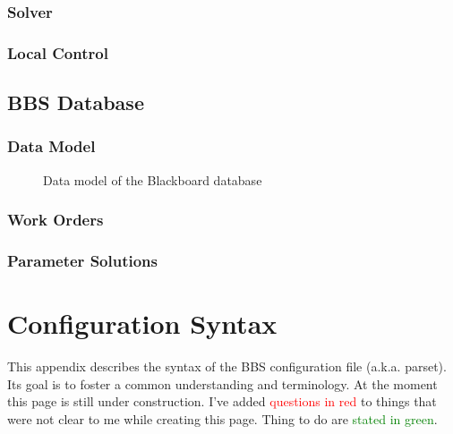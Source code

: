 \documentclass[10pt]{lofar}
\begin{document}
\subsubsection{Solver}
\label{subsubsec:design-solver}

\subsubsection{Local Control}
\label{subsubsec:design-local-control}

\subsection{BBS Database}
\label{subsec:design-database}

\subsubsection{Data Model}
\label{subsubsec:design-data-model}
\begin{figure}
\caption{Data model of the Blackboard database}
\end{figure}

\subsubsection{Work Orders}
\label{subsubsec:design-work-orders}

\subsubsection{Parameter Solutions}
\label{subsubsec:design-parmsolutions}

\pagebreak



\pagebreak

\appendix
\section{Configuration Syntax}

This appendix describes the syntax of the BBS configuration file (a.k.a.
parset). Its goal is to foster a common understanding and terminology. At the
moment this page is still under construction. I've added
\textcolor{red}{questions in red} to things that were not clear to me while
creating this page. Thing to do are \textcolor{green}{stated in green}.
\end{document}
